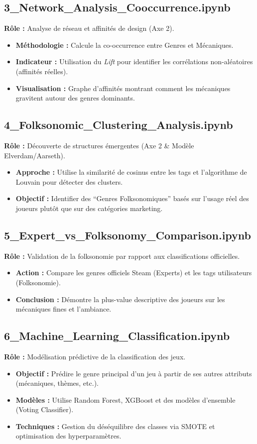 \documentclass{article}
\begin{document}
\subsection{3\_Network\_Analysis\_Cooccurrence.ipynb}
	\textbf{Rôle :} Analyse de réseau et affinités de design (Axe 2).
\begin{itemize}
    \item \textbf{Méthodologie :} Calcule la co-occurrence entre Genres et Mécaniques.
    \item \textbf{Indicateur :} Utilisation du \textit{Lift} pour identifier les corrélations non-aléatoires (affinités réelles).
    \item \textbf{Visualisation :} Graphe d'affinités montrant comment les mécaniques gravitent autour des genres dominants.
\end{itemize}

\subsection{4\_Folksonomic\_Clustering\_Analysis.ipynb}
	\textbf{Rôle :} Découverte de structures émergentes (Axe 2 \& Modèle Elverdam/Aarseth).
\begin{itemize}
    \item \textbf{Approche :} Utilise la similarité de cosinus entre les tags et l'algorithme de Louvain pour détecter des clusters.
    \item \textbf{Objectif :} Identifier des ``Genres Folksonomiques'' basés sur l'usage réel des joueurs plutôt que sur des catégories marketing.
\end{itemize}

\subsection{5\_Expert\_vs\_Folksonomy\_Comparison.ipynb}
	\textbf{Rôle :} Validation de la folksonomie par rapport aux classifications officielles.
\begin{itemize}
    \item \textbf{Action :} Compare les genres officiels Steam (Experts) et les tags utilisateurs (Folksonomie).
    \item \textbf{Conclusion :} Démontre la plus-value descriptive des joueurs sur les mécaniques fines et l'ambiance.
\end{itemize}

\subsection{6\_Machine\_Learning\_Classification.ipynb}
	\textbf{Rôle :} Modélisation prédictive de la classification des jeux.
\begin{itemize}
    \item \textbf{Objectif :} Prédire le genre principal d'un jeu à partir de ses autres attributs (mécaniques, thèmes, etc.).
    \item \textbf{Modèles :} Utilise Random Forest, XGBoost et des modèles d'ensemble (Voting Classifier).
    \item \textbf{Techniques :} Gestion du déséquilibre des classes via SMOTE et optimisation des hyperparamètres.
\end{itemize}
\end{document}
